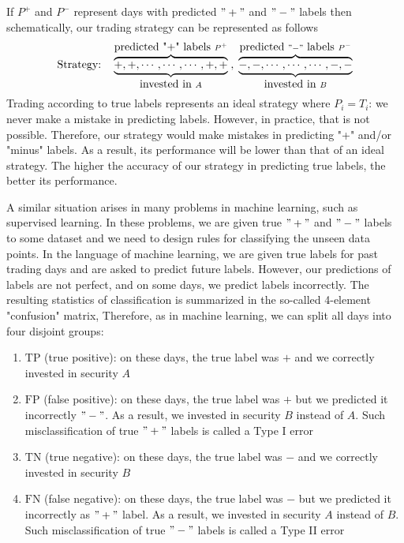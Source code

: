 \documentclass{article}
\begin{document}
\medskip
\noindent
If $P^{+}$ and $P^{-}$ represent days with predicted $"+"$ and $"-"$ labels then schematically, our trading strategy can be represented as follows
\begin{equation*}
    \hbox{Strategy:}  \quad \overbrace{\underbrace{ +,+,\cdots, \cdots ,
    \cdots, +,+ }_{\hbox{invested in } A}}^{\hbox{predicted "+" labels }P^{+}}
    \; , \; 
\overbrace{
\underbrace{-,-,\cdots,\cdots,\cdots,-,-}_{\hbox{invested in } B}}^{\hbox{predicted }"-"
\hbox{ labels } P^{-}} 
\end{equation*}
Trading according to true labels represents an ideal strategy where $P_{i}=T_{i}$: we never make a mistake
in predicting labels. However, in practice, that is not possible. Therefore, our strategy would make mistakes
in predicting "+" and/or "minus" labels. As a result, its performance will be lower than that of an ideal strategy. The higher the accuracy of our strategy in predicting true labels, the better its performance.

A similar situation arises in many problems in machine learning, such as supervised learning. In these problems, we are given true $"+"$ and $"-"$ labels to some dataset and we need to design rules for classifying the unseen data points. In the language of machine learning, we are given true labels for past trading days and are asked to predict future labels. 
However, our predictions of labels are not perfect, and on some days, we predict labels incorrectly. The resulting statistics of classification is summarized in the so-called 4-element "confusion" matrix, 
Therefore, as in machine learning, we can split all days into four disjoint groups:
\medskip
\begin{enumerate}[nosep]
\item  $\text{TP}$ (true positive): on these days, the true label was $+$ and we correctly invested in security $A$
\item  $\text{FP}$ (false positive): on these days, the true label was $+$ but we predicted it incorrectly $"-"$.
As a result, we invested in security $B$ instead of $A$. Such misclassification of true $"+"$ labels is called a Type I error
\item  $\text{TN}$ (true negative): on these days, the true label was $-$ and we correctly invested in security $B$
\item  $\text{FN}$ (false negative): on these days, the true label was $-$ but we predicted it incorrectly as
$"+"$ label. As a result, we invested in security $A$ instead of $B$. 
Such misclassification of true $"-"$ labels is called a Type II error
\end{enumerate}
\end{document}
